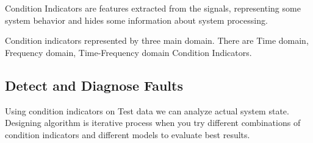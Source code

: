\documentclass[class=article, crop=false]{standalone}
\begin{document}
Condition Indicators are features extracted from the signals, representing some
system behavior and hides some information about system processing.

Condition indicators represented by three main domain. There are Time
domain, Frequency domain, Time-Frequency domain Condition Indicators.

\subsection{Detect and Diagnose Faults}
Using condition indicators on Test data we can analyze actual system state.
Designing algorithm is iterative process when you try different
combinations of condition indicators and different models to evaluate best
results.






\end{document}
